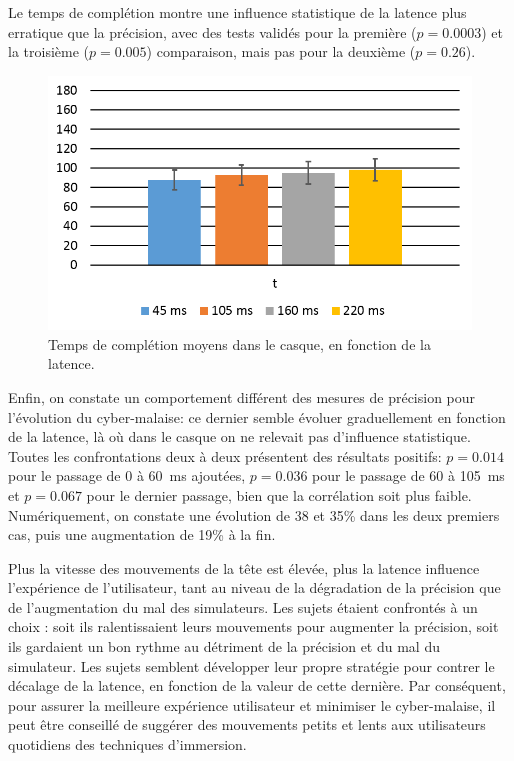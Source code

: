 	\par Le temps de complétion montre une influence statistique de la latence plus erratique que la précision, avec des tests validés pour la première ($p = 0.0003$) et la troisième ($p = 0.005$) comparaison, mais pas pour la deuxième ($p = 0.26$).
	
	\begin{figure}
		\centering
		\includegraphics[width=0.8\linewidth]{Figures/CasqueCompletionTimeResults.png}
		\caption{Temps de complétion moyens dans le casque, en fonction de la latence.}
		\label{fig:casque_completion_time}
	\end{figure}
	
	
	\par Enfin, on constate un comportement différent des mesures de précision pour l'évolution du cyber-malaise: ce dernier semble évoluer graduellement en fonction de la latence, là où dans le casque on ne relevait pas d'influence statistique. Toutes les confrontations deux à deux présentent des résultats positifs: $p = 0.014$ pour le passage de 0 à 60~ms ajoutées, $p = 0.036$ pour le passage de 60 à 105~ms et $p = 0.067$ pour le dernier passage, bien que la corrélation soit plus faible. Numériquement, on constate une évolution de 38 et 35\% dans les deux premiers cas, puis une augmentation de 19\% à la fin.
	
	\par Plus la vitesse des mouvements de la tête est élevée, plus la latence influence l'expérience de l'utilisateur, tant au niveau de la dégradation de la précision que de l'augmentation du mal des simulateurs. Les sujets étaient confrontés à un choix : soit ils ralentissaient leurs mouvements pour augmenter la précision, soit ils gardaient un bon rythme au détriment de la précision et du mal du simulateur. Les sujets semblent développer leur propre stratégie pour contrer le décalage de la latence, en fonction de la valeur de cette dernière. Par conséquent, pour assurer la meilleure expérience utilisateur et minimiser le cyber-malaise, il peut être conseillé de suggérer des mouvements petits et lents aux utilisateurs quotidiens des techniques d'immersion.	
	
